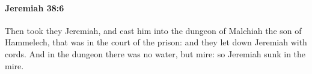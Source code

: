 
		\paragraph{Jeremiah 38:6} %
			\label{JEREMIAH-38-6}

			Then took they Jeremiah, and cast him into the dungeon of Malchiah the son of Hammelech, that was in the court of the prison: and they let down Jeremiah with cords. And in the dungeon there was no water, but mire: so Jeremiah sunk in the mire.


